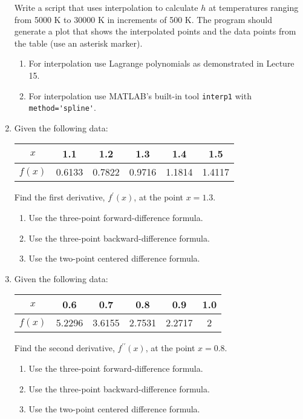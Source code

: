 \begin{fullwidth}
\begin{enumerate}
Write a script that uses interpolation to calculate $h$ at temperatures ranging from 5000 K to 30000 K in increments of 500 K.  The program should generate a plot that shows the interpolated points and the data points from the table (use an asterisk marker).  
\begin{enumerate}
\item For interpolation use Lagrange polynomials as demonstrated in Lecture 15.
\item For interpolation use MATLAB's built-in tool \lstinline[style=myMatlab]{interp1} with \lstinline[style=myMatlab]{method='spline'}.
\end{enumerate}

\vspace{2.0cm}

\item Given the following data:

\begin{table}[h!]
\centering
\begin{tabular}{|c|c|c|c|c|c|}
\hline
$x$ & 1.1 & 1.2 & 1.3 & 1.4 & 1.5 \\ \hline
$f(x)$ & 0.6133 & 0.7822 & 0.9716 & 1.1814 & 1.4117 \\ \hline
\end{tabular}
\end{table}

Find the first derivative, $f^{\prime}(x)$, at the point $x=1.3$.
\begin{enumerate}
\item Use the three-point forward-difference formula.
\item Use the three-point backward-difference formula.
\item Use the two-point centered difference formula.
\end{enumerate}

\vspace{2.0cm}

\item Given the following data:

\begin{table}[h!]
\centering
\begin{tabular}{|c|c|c|c|c|c|}
\hline
$x$ & 0.6 & 0.7 & 0.8 & 0.9 & 1.0 \\ \hline
$f(x)$ & 5.2296 & 3.6155 & 2.7531 & 2.2717 & 2 \\ \hline
\end{tabular}
\end{table}

Find the second derivative, $f^{\prime \prime}(x)$, at the point $x=0.8$.
\begin{enumerate}
\item Use the three-point forward-difference formula.
\item Use the three-point backward-difference formula.
\item Use the two-point centered difference formula.
\end{enumerate}

\end{enumerate}
\end{fullwidth}
